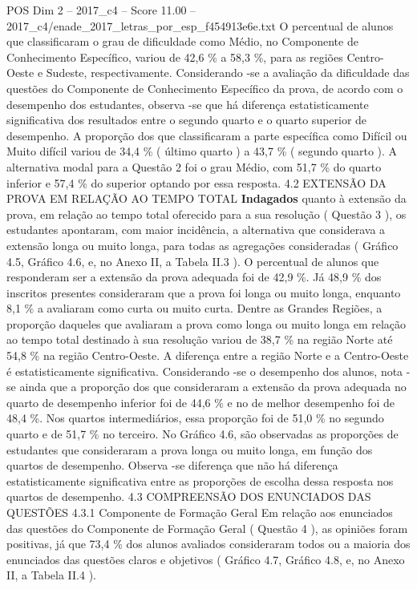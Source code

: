 \begin{textsample}{POS Dim 2 – 2017\_c4 – Score 11.00 – 2017\_c4/enade\_2017\_letras\_por\_esp\_f454913e6e.txt}
O percentual de alunos que classificaram o grau de dificuldade como Médio, no Componente de Conhecimento Específico, variou de 42,6 \% a 58,3 \%, para as regiões Centro-Oeste e Sudeste, respectivamente.
Considerando -se a avaliação da dificuldade das questões do Componente de Conhecimento Específico da prova, de acordo com o desempenho dos estudantes, observa -se que há diferença estatisticamente significativa dos resultados entre o segundo quarto e o quarto superior de desempenho.
A proporção dos que classificaram a parte específica como Difícil ou Muito difícil variou de 34,4 \% ( último quarto ) a 43,7 \% ( segundo quarto ).
A alternativa modal para a Questão 2 foi o grau Médio, com 51,7 \% do quarto inferior e 57,4 \% do superior optando por essa resposta. 4.2 EXTENSÃO DA PROVA EM RELAÇÃO AO TEMPO TOTAL \textbf{Indagados} quanto à extensão da prova, em relação ao tempo total oferecido para a sua resolução ( Questão 3 ), os estudantes apontaram, com maior incidência, a alternativa que considerava a extensão longa ou muito longa, para todas as agregações consideradas ( Gráfico 4.5, Gráfico 4.6, e, no Anexo II, a Tabela II.3 ).
O percentual de alunos que responderam ser a extensão da prova adequada foi de 42,9 \%.
Já 48,9 \% dos inscritos presentes consideraram que a prova foi longa ou muito longa, enquanto 8,1 \% a avaliaram como curta ou muito curta.
Dentre as Grandes Regiões, a proporção daqueles que avaliaram a prova como longa ou muito longa em relação ao tempo total destinado à sua resolução variou de 38,7 \% na região Norte até 54,8 \% na região Centro-Oeste.
A diferença entre a região Norte e a Centro-Oeste é estatisticamente significativa.
Considerando -se o desempenho dos alunos, nota -se ainda que a proporção dos que consideraram a extensão da prova adequada no quarto de desempenho inferior foi de 44,6 \% e no de melhor desempenho foi de 48,4 \%.
Nos quartos intermediários, essa proporção foi de 51,0 \% no segundo quarto e de 51,7 \% no terceiro.
No Gráfico 4.6, são observadas as proporções de estudantes que consideraram a prova longa ou muito longa, em função dos quartos de desempenho.
Observa -se diferença que não há diferença estatisticamente significativa entre as proporções de escolha dessa resposta nos quartos de desempenho. 4.3 COMPREENSÃO DOS ENUNCIADOS DAS QUESTÕES 4.3.1 Componente de Formação Geral Em relação aos enunciados das questões do Componente de Formação Geral ( Questão 4 ), as opiniões foram positivas, já que 73,4 \% dos alunos avaliados consideraram todos ou a maioria dos enunciados das questões claros e objetivos ( Gráfico 4.7, Gráfico 4.8, e, no Anexo II, a Tabela II.4 ).

\end{textsample}

